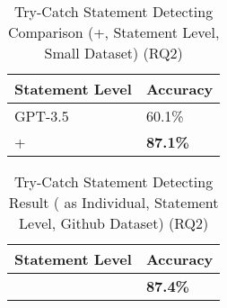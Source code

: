 
\begin{table}[t]%
  \caption{Try-Catch Statement Detecting Comparison ({\xblock}+{\xstate}, Statement Level, Small Dataset) (RQ2)}
  \vspace{-12pt}
  \small
	\begin{center}
		\renewcommand{\arraystretch}{1}
		\begin{tabular}{| p{3.05cm}<{\centering} | p{1.2cm}<{\centering}|}
		  \hline
		Statement Level	  & Accuracy \\
			\hline
                        GPT-3.5 & 60.1\%  \\
			\hline
			\xblock + \xstate   & \textbf{87.1\%} \\
			\hline
		\end{tabular}
		\label{tab:xstate-3}
	\end{center}
\end{table}

\begin{table}[t]%
\caption{Try-Catch Statement Detecting Result ({\xstate} as Individual, Statement Level, Github Dataset) (RQ2)}
  \vspace{-12pt}
  \small
	\begin{center}
		\renewcommand{\arraystretch}{1}
		\begin{tabular}{| p{3.05cm}<{\centering} | p{1.2cm}<{\centering}|}
		  \hline
		Statement Level	  & Accuracy\\
			\hline
			\hline
			\xstate  & \textbf{87.4\%}  \\
			\hline
		\end{tabular}
		\label{tab:xstate-4}
	\end{center}
\end{table}

